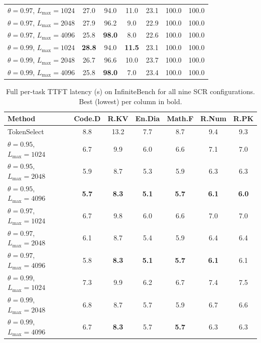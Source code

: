 \documentclass[10pt,conference]{IEEEtran}
\begin{document}
\begin{table}[t]
\begin{tabular}{lcccccc}
$\theta\!=\!0.97$, $L_{\max}\!=\!1024$      & 27.0 & 94.0 & 11.0 & 23.1 & 100.0 & 100.0 \\
$\theta\!=\!0.97$, $L_{\max}\!=\!2048$      & 27.9 & 96.2 & \phantom{0}9.0 & 22.9 & 100.0 & 100.0 \\
$\theta\!=\!0.97$, $L_{\max}\!=\!4096$      & 25.8 & \textbf{98.0} & \phantom{0}8.0 & 22.6 & 100.0 & 100.0 \\
$\theta\!=\!0.99$, $L_{\max}\!=\!1024$      & \textbf{28.8} & 94.0 & \textbf{11.5} & 23.1 & 100.0 & 100.0 \\
$\theta\!=\!0.99$, $L_{\max}\!=\!2048$      & 26.7 & 96.6 & 10.0 & 23.7 & 100.0 & 100.0 \\
$\theta\!=\!0.99$, $L_{\max}\!=\!4096$      & 25.8 & \textbf{98.0} & \phantom{0}7.0 & 23.4 & 100.0 & 100.0 \\
\bottomrule
\end{tabular}
\end{table}

\begin{table}[t]
\centering
\caption{Full per-task TTFT latency (s) on InfiniteBench for all nine SCR
configurations. Best (lowest) per column in bold.}
\label{tab:infbench-latency-full}
\small
\begin{tabular}{lcccccc}
\toprule
\textbf{Method} & \textbf{Code.D} & \textbf{R.KV} & \textbf{En.Dia} & \textbf{Math.F} & \textbf{R.Num} & \textbf{R.PK} \\
\midrule
TokenSelect                            & 8.8 & 13.2 & 7.7 & 8.7 & 9.4 & 9.3 \\
\midrule
$\theta\!=\!0.95$, $L_{\max}\!=\!1024$      & 6.7 & 9.9 & 6.0 & 6.6 & 7.1 & 7.0 \\
$\theta\!=\!0.95$, $L_{\max}\!=\!2048$      & 5.9 & 8.7 & 5.3 & 5.9 & 6.3 & 6.3 \\
$\theta\!=\!0.95$, $L_{\max}\!=\!4096$      & \textbf{5.7} & \textbf{8.3} & \textbf{5.1} & \textbf{5.7} & \textbf{6.1} & \textbf{6.0} \\
$\theta\!=\!0.97$, $L_{\max}\!=\!1024$      & 6.7 & 9.8 & 6.0 & 6.6 & 7.0 & 7.0 \\
$\theta\!=\!0.97$, $L_{\max}\!=\!2048$      & 6.1 & 8.7 & 5.4 & 5.9 & 6.4 & 6.4 \\
$\theta\!=\!0.97$, $L_{\max}\!=\!4096$      & 5.8 & \textbf{8.3} & \textbf{5.1} & \textbf{5.7} & \textbf{6.1} & 6.1 \\
$\theta\!=\!0.99$, $L_{\max}\!=\!1024$      & 7.3 & 9.9 & 6.2 & 6.7 & 7.4 & 7.5 \\
$\theta\!=\!0.99$, $L_{\max}\!=\!2048$      & 6.8 & 8.7 & 5.7 & 5.9 & 6.7 & 6.6 \\
$\theta\!=\!0.99$, $L_{\max}\!=\!4096$      & 6.7 & \textbf{8.3} & 5.7 & \textbf{5.7} & 6.3 & 6.3 \\
\bottomrule
\end{tabular}
\end{table}


\end{document}
